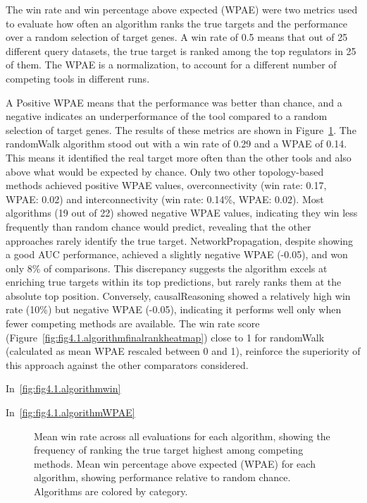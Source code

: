The win rate and win percentage above expected (WPAE) were two metrics used to evaluate how often an algorithm ranks the true targets and the performance over a random selection of target genes. A win rate of 0.5 means that out of 25 different query datasets, the true target is ranked among the top regulators in 25 of them. The WPAE is a normalization, to account for a different number of competing tools in different runs. 

A Positive WPAE means that the performance was better than chance, and a negative indicates an underperformance of the tool compared to a random selection of target genes. The results of these metrics are shown in Figure~\ref{fig:fig4.3.WinandWPAE}. The randomWalk algorithm stood out with a win rate of 0.29 and a WPAE of 0.14. This means it identified the real target more often than the other tools and also above what would be expected by chance. Only two other topology-based methods achieved positive WPAE values, overconnectivity (win rate: 0.17, WPAE: 0.02) and interconnectivity (win rate: 0.14\%, WPAE: 0.02).  Most algorithms (19 out of 22) showed negative WPAE values, indicating they win less frequently than random chance would predict, revealing that the other approaches rarely identify the true target. NetworkPropagation, despite showing a good \gls{AUC} performance, achieved a slightly negative WPAE (-0.05), and won only 8\% of comparisons. This discrepancy suggests the algorithm excels at enriching true targets within its top predictions, but rarely ranks them at the absolute top position. Conversely, causalReasoning showed a relatively high win rate (10\%) but negative WPAE (-0.05), indicating it performs well only when fewer competing methods are available. The win rate score (Figure~\ref{fig:fig4.1.algorithmfinalrankheatmap}) close to 1 for randomWalk (calculated as mean WPAE rescaled between 0 and 1), reinforce the superiority of this approach against the other comparators considered.

In~\ref{fig:fig4.1.algorithmwin}

In~\ref{fig:fig4.1.algorithmWPAE}

\begin{figure}[htbp]
  \centering
  \caption[Mean win rate across all evaluations for each algorithm.]{Mean win rate across all evaluations for each algorithm, showing the frequency of ranking the true target highest among competing methods. Mean win percentage above expected (WPAE) for each algorithm, showing performance relative to random chance. Algorithms are colored by category.}
  \label{fig:fig4.3.WinandWPAE}
\end{figure}

